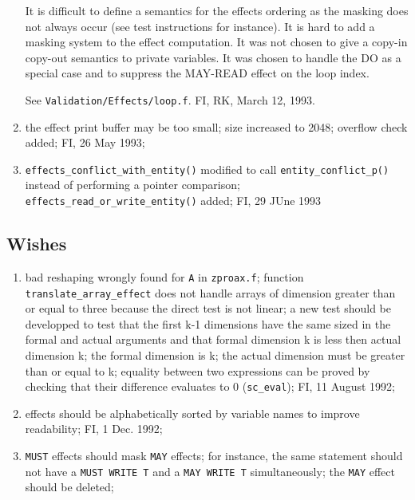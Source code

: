 \begin{enumerate}
	It is difficult to define a semantics for the effects ordering
	as the masking does not always occur (see test instructions for
instance).
	It is hard to add a masking system to the effect computation.
	It was not chosen to give a copy-in copy-out semantics to
	private variables.
	It was chosen to handle the DO as a special case and to
	suppress the MAY-READ effect on the loop index.

	See \verb+Validation/Effects/loop.f+. FI, RK, March 12, 1993.

  \item the effect print buffer may be too small; size increased to
	2048; overflow check added; FI, 26 May 1993;

  \item \verb+effects_conflict_with_entity()+ modified to call
	\verb+entity_conflict_p()+ instead of performing a pointer
	comparison; \verb+effects_read_or_write_entity()+ added;
	FI, 29 JUne 1993
	
\end{enumerate}

\subsection{Wishes}

\begin{enumerate}

  \item bad reshaping wrongly found for \verb+A+ in \verb+zproax.f+; function
	\verb+translate_array_effect+ does not handle arrays of dimension
	greater than or equal to three because the direct test is not
	linear; a new test should be developped to test that the first
	k-1 dimensions have the same sized in the formal and actual arguments
	and that formal dimension k is less then actual dimension k;
	the formal dimension is k; the actual dimension must be greater
	than or equal to k; equality between two expressions can be proved
	by checking that their difference evaluates to 0 (\verb+sc_eval+);
	FI, 11 August 1992;

  \item effects should be alphabetically sorted by variable names to
	improve readability; FI, 1 Dec. 1992;

  \item \verb+MUST+ effects should mask \verb+MAY+ effects; 
	for instance, the same
	statement should not have a \verb+MUST WRITE T+ and a
	\verb+MAY WRITE T+ simultaneously; the \verb+MAY+ effect
	should be deleted;
	
\end{enumerate}

